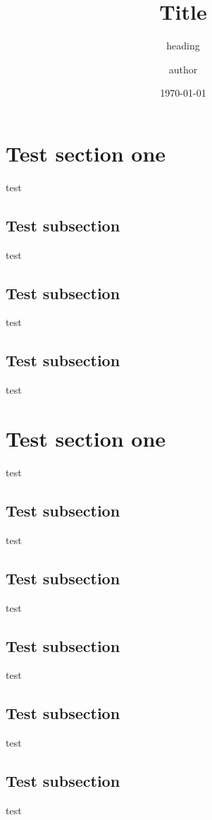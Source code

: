 \documentclass{beamer}
\title[\date{\today}]{Title}
\subtitle{heading}
\author[au]{author}
\institute[]{}
\date[]{\today}
\begin{document}
    \section{Test section one}
    \begin{frame}
        test
    \end{frame}
    \subsection{Test subsection}
    \begin{frame}
        test
    \end{frame}
    \subsection{Test subsection}
    \begin{frame}
        test
    \end{frame}
    \subsection{Test subsection}
    \begin{frame}
        test
    \end{frame}

    \section{Test section one}
    \begin{frame}
        test
    \end{frame}
    \subsection{Test subsection}
    \begin{frame}
        test
    \end{frame}
    \subsection{Test subsection}
    \begin{frame}
        test
    \end{frame}
    \subsection{Test subsection}
    \begin{frame}
        test
    \end{frame}
    \subsection{Test subsection}
    \begin{frame}
        test
    \end{frame}
    \subsection{Test subsection}
    \begin{frame}
        test
    \end{frame}
\end{document}
